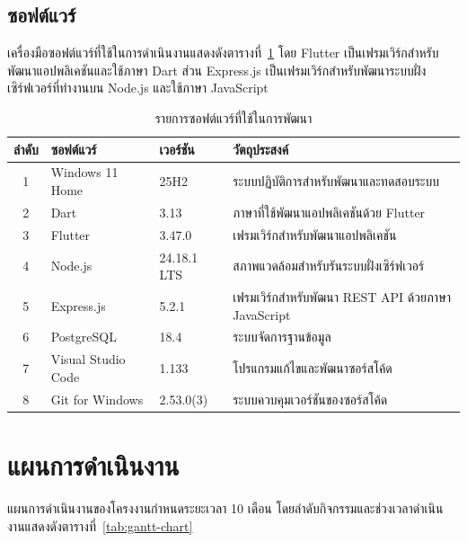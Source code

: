 \subsection{ซอฟต์แวร์}

เครื่องมือซอฟต์แวร์ที่ใช้ในการดำเนินงานแสดงดังตารางที่~\ref{tab:software-tools} โดย Flutter เป็นเฟรมเวิร์กสำหรับพัฒนาแอปพลิเคชันและใช้ภาษา Dart ส่วน Express.js เป็นเฟรมเวิร์กสำหรับพัฒนาระบบฝั่งเซิร์ฟเวอร์ที่ทำงานบน Node.js และใช้ภาษา JavaScript

\begin{table}[H]
\centering
\caption{รายการซอฟต์แวร์ที่ใช้ในการพัฒนา}
\label{tab:software-tools}
\small
\begin{tabular}{|c|p{3.1cm}|p{2.2cm}|p{3.6cm}|}
\hline
\textbf{ลำดับ} & \textbf{ซอฟต์แวร์} & \textbf{เวอร์ชัน} & \textbf{วัตถุประสงค์} \\ \hline
1 & Windows 11 Home & 25H2 & ระบบปฏิบัติการสำหรับพัฒนาและทดสอบระบบ \\ \hline
2 & Dart & 3.13 & ภาษาที่ใช้พัฒนาแอปพลิเคชันด้วย Flutter \\ \hline
3 & Flutter & 3.47.0 & เฟรมเวิร์กสำหรับพัฒนาแอปพลิเคชัน \\ \hline
4 & Node.js & 24.18.1 LTS & สภาพแวดล้อมสำหรับรันระบบฝั่งเซิร์ฟเวอร์ \\ \hline
5 & Express.js & 5.2.1 & เฟรมเวิร์กสำหรับพัฒนา REST API ด้วยภาษา JavaScript \\ \hline
6 & PostgreSQL & 18.4 & ระบบจัดการฐานข้อมูล \\ \hline
7 & Visual Studio Code & 1.133 & โปรแกรมแก้ไขและพัฒนาซอร์สโค้ด \\ \hline
8 & Git for Windows & 2.53.0(3) & ระบบควบคุมเวอร์ชันของซอร์สโค้ด \\ \hline
\end{tabular}
\end{table}

\clearpage
\section{แผนการดำเนินงาน}

แผนการดำเนินงานของโครงงานกำหนดระยะเวลา 10 เดือน โดยลำดับกิจกรรมและช่วงเวลาดำเนินงานแสดงดังตารางที่~\ref{tab:gantt-chart}

